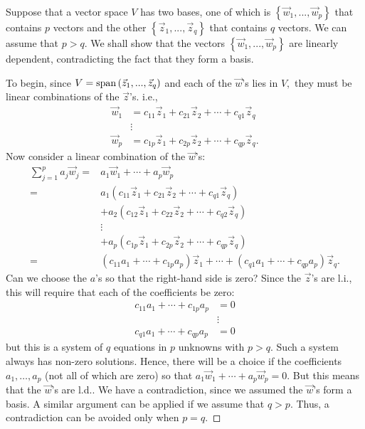 \documentclass[
  a4paper,
  DIV=11,
  numbers=noendperiod,
  oneside]{scrreprt}
\theoremstyle{definition}
\theoremstyle{remark}
\newenvironment{fbx}[3]{\begin{tcolorbox}[enhanced, breakable,%
attach boxed title to top*={xshift=1.4pt},
boxed title style={boxrule=0.0mm, fuzzy shadow={1pt}{-1pt}{0mm}{0.1mm}{gray}, arc=.3em, rounded corners=east, sharp corners=west}, colframe=#1-color2, colbacktitle=#1-color1, colback = white, coltitle=black,  titlerule=0mm, toprule=0pt, bottomrule=.7pt, leftrule=.3em, rightrule=0pt, outer arc=.3em,  arc=0pt,	 sharp corners = east, left=.5em, bottomtitle=1mm, toptitle=1mm,title=\textbf{#2}\hspace{0.5em}{#3}]}
{\end{tcolorbox}}
\begin{document}
\label{Proofux2a-2.2}
\begin{fbx}{Proof}{Proof}{}
\label{Proof*-2.2}
Suppose that a vector space \(V\) has two bases, one of which is
\(\left\{ {\vec w}_{1},...,{\vec w}_{p}\right\}\) that contains \(p\)
vectors and the other \(\left\{ {\vec z}_{1},...,{\vec z}_{q}\right\}\)
that contains \(q\) vectors. We can assume that \(p>q.\) We shall show
that the vectors \(\left\{ {\vec w}_{1},...,{\vec w}_{p}\right\}\) are
linearly dependent, contradicting the fact that they form a basis.

To begin, since
\(V={\rm span}\left( {\vec z}_{1},...,{\vec z}_{q}\right)\) and each of
the \({\vec w}\)'s lies in \(V,\) they must be linear combinations of
the \({\vec z}\)'s. i.e., \[\begin{aligned}
{\vec w}_{1} &=c_{11}{\vec z}_{1}+c_{21}{\vec z}_{2}+\cdots +c_{q1}
{\vec z}_{q} \\
&\vdots \\
{\vec w}_{p} &=c_{1p}{\vec z}_{1}+c_{2p}{\vec z}_{2}+\cdots +c_{qp}
{\vec z}_{q}.
\end{aligned}\] Now consider a linear combination of the \({\vec w}\)'s:
\[\begin{aligned}
\sum_{j=1}^{p}a_{j}{\vec w}_{j}  = & a_{1}{\vec w}_{1}+\cdots +a_{p}
{\vec w}_{p} \\
= & a_{1}\left( c_{11}{\vec z}_{1}+c_{21}{\vec z}_{2}+\cdots +c_{q1}
{\vec z}_{q}\right) \\
&+ a_{2} \left( c_{12}{\vec z}_{1}+c_{22}{\vec z}_{2}+\cdots +c_{q2}
{\vec z}_{q}\right) \\
& \vdots \\
& + a_{p}\left( c_{1p}{\vec z}_{1}+c_{2p}{\vec z}_{2}+\cdots +c_{qp}
{\vec z}_{q}\right) \\
= & 
\left( c_{11}a_{1}+\cdots +c_{1p}a_{p}\right) {\vec z}_{1}+\cdots
+\left( c_{q1}a_{1}+\cdots +c_{qp}a_{p}\right) {\vec z}_{q}.
\end{aligned}\] Can we choose the \(a\)'s so that the right-hand side is
zero? Since the \({\vec z}\)'s are l.i., this will require that each of
the coefficients be zero: \[\begin{aligned}
c_{11}a_{1}+\cdots +c_{1p}a_{p} &=0 \\
&\vdots \\
c_{q1}a_{1}+\cdots +c_{qp}a_{p} &=0
\end{aligned}\] but this is a system of \(q\) equations in \(p\)
unknowns with \(p>q.\) Such a system always has non-zero solutions.
Hence, there will be a choice if the coefficients
\(a_{1},\ldots ,a_{p}\) (not all of which are zero) so that \(a_{1}
{\vec w}_{1}+\cdots +a_{p}{\vec w}_{p}=0.\) But this means that the
\({\vec w}\)'s are l.d.. We have a contradiction, since we assumed the
\({\vec w}\)'s form a basis. A similar argument can be applied if we
assume that \(q>p.\) Thus, a contradiction can be avoided only when
\(p=q.\)~◻

\end{fbx}
\end{document}

